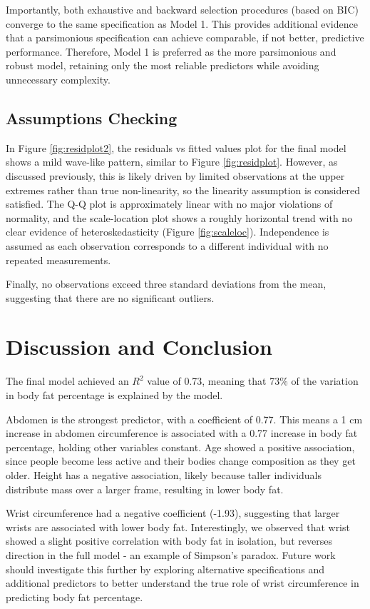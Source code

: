 \documentclass[letterpaper,9pt,twocolumn,twoside,]{pinp}
\begin{document}
Importantly, both exhaustive and backward selection procedures (based on
BIC) converge to the same specification as Model 1. This provides
additional evidence that a parsimonious specification can achieve
comparable, if not better, predictive performance. Therefore, Model 1 is
preferred as the more parsimonious and robust model, retaining only the
most reliable predictors while avoiding unnecessary complexity.

\subsection{Assumptions Checking}\label{assumptions-checking}

In Figure \ref{fig:residplot2}, the residuals vs fitted values plot for
the final model shows a mild wave-like pattern, similar to Figure
\ref{fig:residplot}. However, as discussed previously, this is likely
driven by limited observations at the upper extremes rather than true
non-linearity, so the linearity assumption is considered satisfied. The
Q-Q plot is approximately linear with no major violations of normality,
and the scale-location plot shows a roughly horizontal trend with no
clear evidence of heteroskedasticity (Figure \ref{fig:scaleloc}).
Independence is assumed as each observation corresponds to a different
individual with no repeated measurements.

Finally, no observations exceed three standard deviations from the mean,
suggesting that there are no significant outliers.

\section{Discussion and Conclusion}\label{discussion-and-conclusion}

The final model achieved an \(R^2\) value of 0.73, meaning that 73\% of
the variation in body fat percentage is explained by the model.

Abdomen is the strongest predictor, with a coefficient of 0.77. This
means a 1 cm increase in abdomen circumference is associated with a 0.77
increase in body fat percentage, holding other variables constant. Age
showed a positive association, since people become less active and their
bodies change composition as they get older. Height has a negative
association, likely because taller individuals distribute mass over a
larger frame, resulting in lower body fat.

Wrist circumference had a negative coefficient (-1.93), suggesting that
larger wrists are associated with lower body fat. Interestingly, we
observed that wrist showed a slight positive correlation with body fat
in isolation, but reverses direction in the full model - an example of
Simpson's paradox. Future work should investigate this further by
exploring alternative specifications and additional predictors to better
understand the true role of wrist circumference in predicting body fat
percentage.
\end{document}
